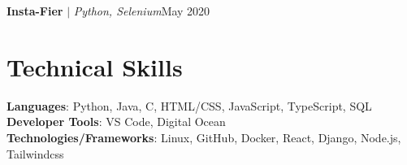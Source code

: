 \documentclass[letterpaper,11pt]{article}
\begin{document}
    \resumeProjectHeading
          {\textbf{Insta-Fier} $|$ \emph{Python, Selenium}}{May 2020}
          \resumeItemListStart
          \resumeItemListEnd 
    \resumeSubHeadingListEnd
 \vspace{-20pt}


%
\section{Technical Skills}
 \begin{itemize}[leftmargin=0.15in, label={}]
    \small{\item{
     \textbf{Languages}{: Python, Java, C, HTML/CSS, JavaScript, TypeScript, SQL} \\
     \textbf{Developer Tools}{: VS Code, Digital Ocean} \\
     \textbf{Technologies/Frameworks}{: Linux, GitHub, Docker, React, Django, Node.js, Tailwindcss} \\
    }}
 \end{itemize}
 \vspace{-16pt}
\end{document}
